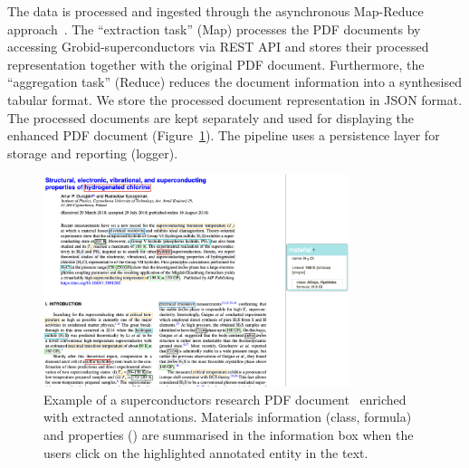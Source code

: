 The data is processed and ingested through the asynchronous Map-Reduce approach~\cite{10.1145/1327452.1327492}.
The ``extraction task'' (Map) processes the PDF documents by accessing Grobid-superconductors via REST API and stores their processed representation together with the original PDF document.
Furthermore, the ``aggregation task'' (Reduce) reduces the document information into a synthesised tabular format.
We store the processed document representation in JSON format. 
The processed documents are kept separately and used for displaying the enhanced PDF document (Figure~\ref{fig:pdf-annotations}).
The pipeline uses a persistence layer for storage and reporting (logger).

\begin{figure}[ht]
    \centering
    \includegraphics[width=0.8\textwidth]{figures/automatic_extraction_supercon/sample-pdf-annotations}
    \caption{\label{fig:pdf-annotations} Example of a superconductors research PDF document~\cite{sample_superconductors_article} enriched with extracted annotations. Materials information (class, formula) and properties (\tc) are summarised in the information box when the users click on the highlighted annotated entity in the text.}
\end{figure}



